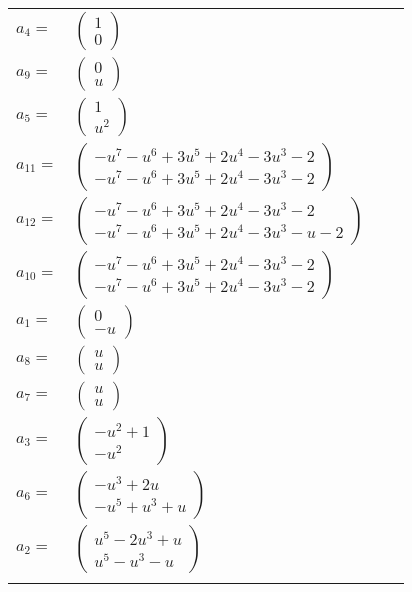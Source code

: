 \documentclass[1p]{elsarticle_modified}
\theoremstyle{definition}
\begin{document}
\begin{tabular}{m{7pt} m{180pt} m{7pt} m{180pt} }
\flushright $a_{4}=$&$\begin{pmatrix}1\\0\end{pmatrix}$ \\
\flushright $a_{9}=$&$\begin{pmatrix}0\\u\end{pmatrix}$ \\
\flushright $a_{5}=$&$\begin{pmatrix}1\\u^2\end{pmatrix}$ \\
\flushright $a_{11}=$&$\begin{pmatrix}- u^7- u^6+3 u^5+2 u^4-3 u^3-2\\- u^7- u^6+3 u^5+2 u^4-3 u^3-2\end{pmatrix}$ \\
\flushright $a_{12}=$&$\begin{pmatrix}- u^7- u^6+3 u^5+2 u^4-3 u^3-2\\- u^7- u^6+3 u^5+2 u^4-3 u^3- u-2\end{pmatrix}$ \\
\flushright $a_{10}=$&$\begin{pmatrix}- u^7- u^6+3 u^5+2 u^4-3 u^3-2\\- u^7- u^6+3 u^5+2 u^4-3 u^3-2\end{pmatrix}$ \\
\flushright $a_{1}=$&$\begin{pmatrix}0\\- u\end{pmatrix}$ \\
\flushright $a_{8}=$&$\begin{pmatrix}u\\u\end{pmatrix}$ \\
\flushright $a_{7}=$&$\begin{pmatrix}u\\u\end{pmatrix}$ \\
\flushright $a_{3}=$&$\begin{pmatrix}- u^2+1\\- u^2\end{pmatrix}$ \\
\flushright $a_{6}=$&$\begin{pmatrix}- u^3+2 u\\- u^5+u^3+u\end{pmatrix}$ \\
\flushright $a_{2}=$&$\begin{pmatrix}u^5-2 u^3+u\\u^5- u^3- u\end{pmatrix}$\\&\end{tabular}
\end{document}
